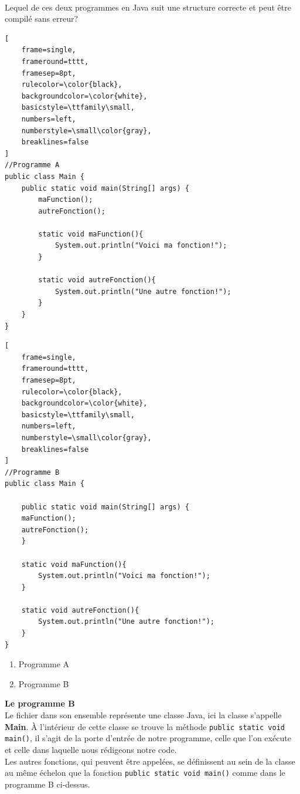 \begin{Exercice}[3 minutes] \\
Lequel de ces deux programmes en Java suit une structure correcte et peut être compilé sans erreur?

\noindent\begin{minipage}{\linewidth}
\begin{lstlisting}[
    frame=single,
    frameround=tttt,
    framesep=8pt,
    rulecolor=\color{black},
    backgroundcolor=\color{white},
    basicstyle=\ttfamily\small,
    numbers=left,
    numberstyle=\small\color{gray},
    breaklines=false
]
//Programme A
public class Main {
    public static void main(String[] args) {
        maFunction();
        autreFonction();

        static void maFunction(){
            System.out.println("Voici ma fonction!");
        }
    
        static void autreFonction(){
            System.out.println("Une autre fonction!");
        }
    }
}
\end{lstlisting}
\end{minipage}\par

\noindent\begin{minipage}{\linewidth}
\begin{lstlisting}[
    frame=single,
    frameround=tttt,
    framesep=8pt,
    rulecolor=\color{black},
    backgroundcolor=\color{white},
    basicstyle=\ttfamily\small,
    numbers=left,
    numberstyle=\small\color{gray},
    breaklines=false
]
//Programme B
public class Main {

    public static void main(String[] args) {
    maFunction();
    autreFonction();
    }

    static void maFunction(){
        System.out.println("Voici ma fonction!");
    }

    static void autreFonction(){
        System.out.println("Une autre fonction!");
    }
}
\end{lstlisting}
\end{minipage}\par

\begin{enumerate}
    \item Programme A
    \item Programme B
\end{enumerate}
\begin{solution}
    \textbf{Le programme B}\\
    Le fichier dans son ensemble représente une classe Java, ici la classe s'appelle \textbf{Main}. À l'intérieur de cette classe se trouve la méthode \lstinline{public static void main()}, il s'agit de la porte d'entrée de notre programme, celle que l'on exécute et celle dans laquelle nous rédigeons notre code.\\
    Les autres fonctions, qui peuvent être appelées, se définissent au sein de la classe au même échelon que la fonction \lstinline{public static void main()} comme dans le programme B ci-dessus. 
\end{solution}
\end{Exercice}

